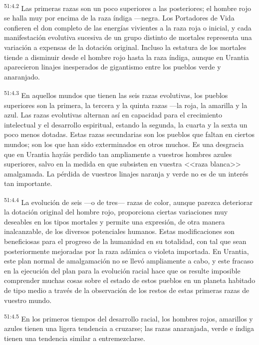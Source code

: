 \par
\textsuperscript{51:4.2} Las primeras razas son un poco superiores a las posteriores; el hombre rojo se halla muy por encima de la raza índiga ---negra. Los Portadores de Vida confieren el don completo de las energías vivientes a la raza roja o inicial, y cada manifestación evolutiva sucesiva de un grupo distinto de mortales representa una variación a expensas de la dotación original. Incluso la estatura de los mortales tiende a disminuir desde el hombre rojo hasta la raza índiga, aunque en Urantia aparecieron linajes inesperados de gigantismo entre los pueblos verde y anaranjado.

\par
\textsuperscript{51:4.3} En aquellos mundos que tienen las seis razas evolutivas, los pueblos superiores son la primera, la tercera y la quinta razas ---la roja, la amarilla y la azul. Las razas evolutivas alternan así en capacidad para el crecimiento intelectual y el desarrollo espiritual, estando la segunda, la cuarta y la sexta un poco menos dotadas. Estas razas secundarias son los pueblos que faltan en ciertos mundos; son los que han sido exterminados en otros muchos. Es una desgracia que en Urantia hayáis perdido tan ampliamente a vuestros hombres azules superiores, salvo en la medida en que subsisten en vuestra <<raza blanca>> amalgamada. La pérdida de vuestros linajes naranja y verde no es de un interés tan importante.

\par
\textsuperscript{51:4.4} La evolución de seis ---o de tres--- razas de color, aunque parezca deteriorar la dotación original del hombre rojo, proporciona ciertas variaciones muy deseables en los tipos mortales y permite una expresión, de otra manera inalcanzable, de los diversos potenciales humanos. Estas modificaciones son beneficiosas para el progreso de la humanidad en su totalidad, con tal que sean posteriormente mejoradas por la raza adámica o violeta importada. En Urantia, este plan normal de amalgamación no se llevó ampliamente a cabo, y este fracaso en la ejecución del plan para la evolución racial hace que os resulte imposible comprender muchas cosas sobre el estado de estos pueblos en un planeta habitado de tipo medio a través de la observación de los restos de estas primeras razas de vuestro mundo.

\par
\textsuperscript{51:4.5} En los primeros tiempos del desarrollo racial, los hombres rojos, amarillos y azules tienen una ligera tendencia a cruzarse; las razas anaranjada, verde e índiga tienen una tendencia similar a entremezclarse.

